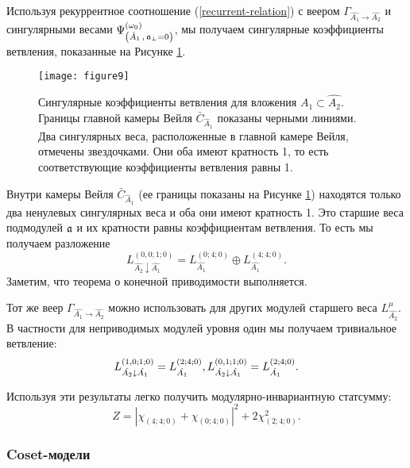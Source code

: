 Используя рекуррентное соотношение  (\ref{recurrent-relation}) с веером
$\Gamma_{\hat{A_1}\rightarrow \hat{A_2}}$ и сингулярными весами $\Psi ^{\left( \omega_0 \right) }_{\left(  \hat A_1\, , \, \mathfrak{a}_{\perp}=0 \right)}$, мы получаем сингулярные коэффициенты ветвления, показанные на Рисунке \ref{fig:AffineA2_A1_branching}.
\begin{figure}[h!tb]
  \centering
  \texttt{[image: figure9]}
  \caption{Сингулярные коэффициенты ветвления для вложения $\hat{A_1}\subset \hat{A_2}$. Границы главной камеры Вейля $\bar{C}_{\hat{A}_1}$ показаны черными линиями. Два сингулярных веса, расположенные в главной камере Вейля, отмечены звездочками. Они оба имеют кратность 1, то есть соответствующие коэффициенты ветвления равны 1.}
  \label{fig:AffineA2_A1_branching}
\end{figure}
Внутри камеры Вейля $\bar{C}_{\hat{A}_1}$ (ее границы показаны на Рисунке \ref{fig:AffineA2_A1_branching}) находятся только два ненулевых сингулярных веса и оба они имеют кратность 1. Это старшие веса подмодулей $\mathfrak{a}$ и их кратности равны коэффициентам ветвления. То есть мы получаем разложение
\begin{equation*}
  \label{eq:43}
  L^{(0,0;1;0)}_{\hat{A_2}\downarrow \hat{A_1}}= L_{\hat{A_1}}^{(0;4;0)}\oplus L_{\hat{A_1}}^{(4;4;0)}.
\end{equation*}
Заметим, что теорема о конечной приводимости выполняется.

Тот же веер $\Gamma_{\hat{A_1}\rightarrow \hat{A_2}}$ можно использовать для других модулей старшего веса $L^{\mu}_{\hat{A_2}}$. В частности для неприводимых модулей уровня один мы получаем тривиальное ветвление:
\begin{equation*}
  \label{eq:44}
   L^{(1,0;1;0)}_{\hat{A_2}\downarrow \hat{A_1}}= L_{\hat{A_1}}^{(2;4;0)},\\
   L^{(0,1;1;0)}_{\hat{A_2}\downarrow \hat{A_1}}= L_{\hat{A_1}}^{(2;4;0)}.
\end{equation*}

Используя эти результаты легко получить модулярно-инвариантную статсумму:
\begin{equation*}
  \label{eq:45}
  Z=\left|\chi_{(4;4;0)}+\chi_{(0;4;0)}\right|^2+2\chi_{(2;4;0)}^2.
\end{equation*}

\subsubsection{Coset-модели}
\label{sec:coset-models}

